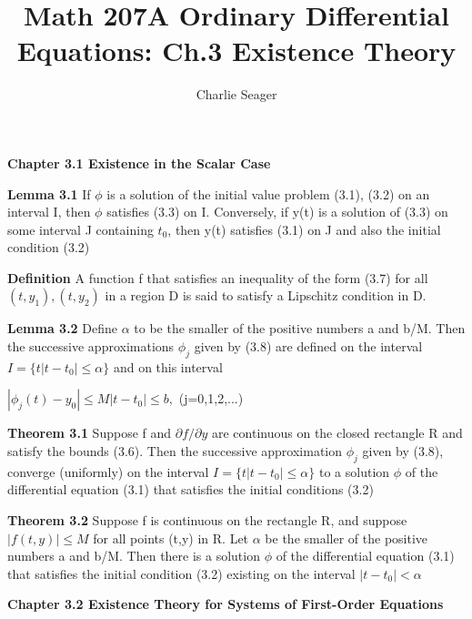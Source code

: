 \documentclass{article}
\newcommand\tab[1][1cm]{\hspace*{#1}}
\begin{document}
\title {Math 207A Ordinary Differential Equations: Ch.3 Existence Theory}

\author{Charlie Seager}

\maketitle

\textbf {Chapter 3.1 Existence in the Scalar Case}

\textbf {Lemma 3.1} If $\phi$ is a solution of the initial value problem (3.1), (3.2) on an interval I, then $\phi$ satisfies (3.3) on I. Conversely, if y(t) is a solution of (3.3) on some interval J containing $t_0$, then y(t) satisfies (3.1) on J and also the initial condition (3.2)

\textbf {Definition} A function f that satisfies an inequality of the form (3.7) for all $(t, y_1), (t, y_2)$ in a region D is said to satisfy a Lipschitz condition in D.

\textbf {Lemma 3.2} Define $\alpha$ to be the smaller of the positive numbers a and b/M. Then the successive approximations $\phi_j$ given by (3.8) are defined on the interval $I = \{t | t-t_0| \leq \alpha \}$ and on this interval
\begin{center}
$|\phi_j(t) - y_0| \leq M |t - t_0| \leq b,$ \tab (j=0,1,2,...)
\end{center}

\textbf {Theorem 3.1} Suppose f and $\partial f / \partial y$ are continuous on the closed rectangle R and satisfy the bounds (3.6). Then the successive approximation $\phi_j$ given by (3.8), converge (uniformly) on the interval $I = \{t | t-t_0| \leq \alpha \}$ to a solution $\phi$ of the differential equation (3.1) that satisfies the initial conditions (3.2)

\textbf {Theorem 3.2} Suppose f is continuous on the rectangle R, and suppose $|f(t,y)| \leq M$ for all points (t,y) in R. Let $\alpha$ be the smaller of the positive numbers a and b/M. Then there is a solution $\phi$ of the differential equation (3.1) that satisfies the initial condition (3.2) existing on the interval $|t-t_0| < \alpha$

\textbf {Chapter 3.2 Existence Theory for Systems of First-Order Equations}
\end{document}
